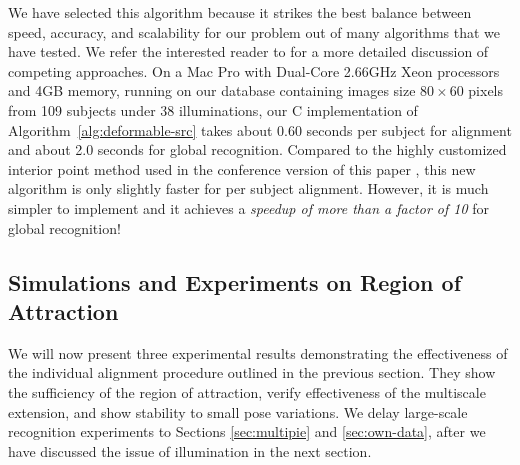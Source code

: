 \documentclass[12pt,journal,draftcls,letterpaper,onecolumn]{IEEEtran}
\begin{document}
%

We have selected this algorithm because it strikes the best
balance between speed, accuracy, and scalability for our problem out of
many algorithms that we have tested. We refer the interested reader to
\cite{YangA2010-pp} for a more detailed discussion of competing
approaches.  On a Mac Pro with
Dual-Core 2.66GHz Xeon processors and 4GB memory, 
running on our database containing images size $80\times 60$ 
pixels from 109 subjects under 38 illuminations,
our C implementation of Algorithm~\ref{alg:deformable-src} takes
about 0.60 seconds per subject for alignment and about 2.0
seconds for global recognition. Compared to the highly
customized interior point method used in the conference version
of this paper \cite{Wagner2009-CVPR}, this new algorithm is 
only slightly faster for per subject alignment. However, it is
much simpler to implement and it achieves a
\emph{speedup of more than a factor of 10} for global
recognition!

\subsection{Simulations and Experiments on Region of
Attraction} We will now present three experimental results
demonstrating the effectiveness of the individual alignment
procedure outlined in the previous section. They show the sufficiency of the
region of attraction, verify effectiveness of the multiscale extension,
and show stability to small pose variations.  We delay large-scale recognition experiments
to Sections \ref{sec:multipie} and \ref{sec:own-data}, after we
have discussed the issue of illumination in the next section.
\end{document}
